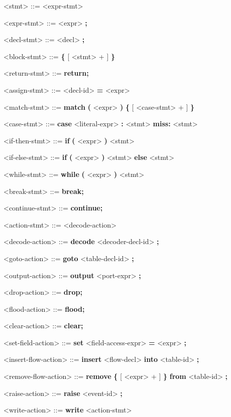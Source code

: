 
\begin{mdframed}
\begin{grammar}

<stmt> ::=
<expr-stmt>

<expr-stmt> ::= <expr> \textbf{;}

<decl-stmt> ::= <decl> \textbf{;}

<block-stmt> ::= 
\textbf{\{}
	[ <stmt> + ]
\textbf{\}}

<return-stmt> ::= \textbf{return;}

<assign-stmt> ::= <decl-id> \textbf{=} <expr>

<match-stmt> ::= \textbf{match} \textbf{(} <expr> \textbf{)}
\textbf{\{}
	[ <case-stmt> + ]
\textbf{\}}

<case-stmt> ::=
\textbf{case} <literal-expr> \textbf{:} <stmt>
\alt \textbf{miss:} <stmt>

<if-then-stmt> ::= \textbf{if} \textbf{(} <expr> \textbf{)}
<stmt>

<if-else-stmt> ::= \textbf{if} \textbf{(} <expr> \textbf{)}
<stmt> \textbf{else} <stmt>

<while-stmt> ::= \textbf{while} \textbf{(} <expr> \textbf{)}
<stmt>

<break-stmt> ::= \textbf{break;}

<continue-stmt> ::= \textbf{continue;}

<action-stmt> ::=
<decode-action>

<decode-action> ::=
\textbf{decode} <decoder-decl-id> \textbf{;}

<goto-action> ::=
\textbf{goto} <table-decl-id> \textbf{;}

<output-action> ::=
\textbf{output} <port-expr> \textbf{;}

<drop-action> ::= \textbf{drop;}

<flood-action> ::= \textbf{flood;}

<clear-action> ::= \textbf{clear;}

<set-field-action> ::= \textbf{set} <field-access-expr> \textbf{=} <expr> \textbf{;}

<insert-flow-action> ::= \textbf{insert} <flow-decl> \textbf{into} <table-id> \textbf{;}

<remove-flow-action> ::= \textbf{remove} \textbf{\{} [ <expr> + ] \textbf{\}}
\textbf{from} <table-id> \textbf{;}

<raise-action> ::= \textbf{raise} <event-id> \textbf{;}

<write-action> ::= \textbf{write} <action-stmt>

\end{grammar}
\end{mdframed}


